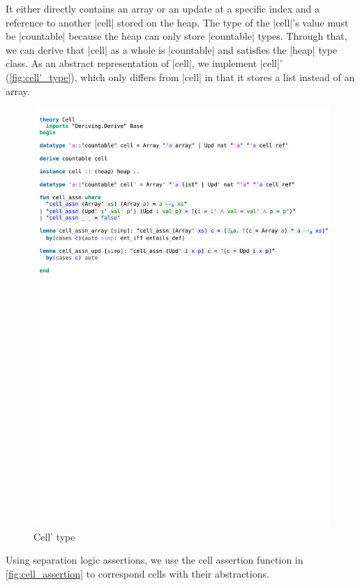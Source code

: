 \noindent It either directly contains an array or an update at a specific index and a reference to another |cell| stored on the heap. The type of the |cell|'s value must be |countable| because the heap can only store |countable| types. Through that, we can derive that |cell| as a whole is |countable| and satisfies the |heap| type class.
As an abstract representation of |cell|, we implement |cell|' (\autoref{fig:cell'_type}), which only differs from |cell| in that it stores a list instead of an array.

\begin{figure}[htpb]
    \includegraphics[trim={0 24cm 0 5cm}, clip, width=1.00\textwidth]{figures/Theory_Cell.pdf}
    \caption[Cell' type]{Cell' type}
    \label{fig:cell'_type}
\end{figure}

\noindent Using separation logic assertions, we use the cell assertion function in \autoref{fig:cell_assertion} to correspond cells with their abstractions.

